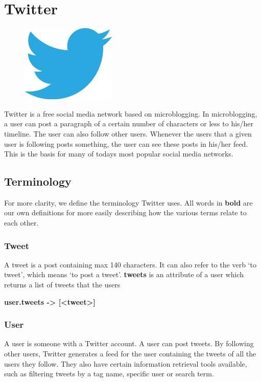 \section{Twitter}\label{sec:twitter}

\begin{figure}
\vspace{-30pt}
\centering
\includegraphics[width = .25\textwidth]{image/twitter-logo.png}
\end{figure}
Twitter is a free social media network based on microblogging. In microblogging, a user can post a paragraph of a certain number of characters or less to his/her timeline. The user can also follow other users. Whenever the users that a given user is following posts something, the user can see these posts in his/her feed. This is the basis for many of todays most popular social media networks.

\subsection{Terminology}
For more clarity, we define the terminology Twitter uses. All words in \textbf{bold} are our own definitions for more easily describing how the various terms relate to each other.

\subsubsection{Tweet}
A tweet is a post containing max 140 characters. It can also refer to the verb ‘to tweet’, which means ‘to post a tweet’. \textbf{tweets} is an attribute of a user which returns a list of tweets that the users

  \textbf{user.tweets -> [<tweet>]}
\subsubsection{User}
A user is someone with a Twitter account. A user can post tweets. By following other users, Twitter generates a feed for the user containing the tweets of all the users they follow. They also have certain information retrieval tools available, such as filtering tweets by a tag name, specific user or search term.

